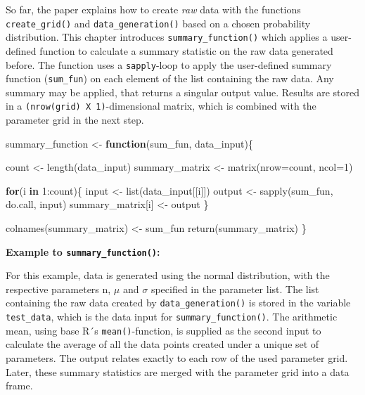 \documentclass[11pt,a4paper]{article}
\newenvironment{Shaded}{\begin{snugshade}}{\end{snugshade}}
\newcommand{\AttributeTok}[1]{\textcolor[rgb]{0.77,0.63,0.00}{#1}}
\newcommand{\ControlFlowTok}[1]{\textcolor[rgb]{0.13,0.29,0.53}{\textbf{#1}}}
\newcommand{\DecValTok}[1]{\textcolor[rgb]{0.00,0.00,0.81}{#1}}
\newcommand{\FunctionTok}[1]{\textcolor[rgb]{0.00,0.00,0.00}{#1}}
\newcommand{\NormalTok}[1]{#1}
\newcommand{\OtherTok}[1]{\textcolor[rgb]{0.56,0.35,0.01}{#1}}
\newcommand{\SpecialCharTok}[1]{\textcolor[rgb]{0.00,0.00,0.00}{#1}}
\begin{document}
So far, the paper explains how to create \emph{raw} data with the
functions \texttt{create\_grid()} and \texttt{data\_generation()} based
on a chosen probability distribution. This chapter introduces
\texttt{summary\_function()} which applies a user-defined function to
calculate a summary statistic on the raw data generated before. The
function uses a \texttt{sapply}-loop to apply the user-defined summary
function (\texttt{sum\_fun}) on each element of the list containing the
raw data. Any summary may be applied, that returns a singular output
value. Results are stored in a \texttt{(nrow(grid)\ X\ 1)}-dimensional
matrix, which is combined with the parameter grid in the next step.

\begin{Shaded}
\begin{Highlighting}[]
\NormalTok{summary\_function }\OtherTok{\textless{}{-}} \ControlFlowTok{function}\NormalTok{(sum\_fun, data\_input)\{}
  
\NormalTok{  count }\OtherTok{\textless{}{-}} \FunctionTok{length}\NormalTok{(data\_input)}
\NormalTok{  summary\_matrix }\OtherTok{\textless{}{-}} \FunctionTok{matrix}\NormalTok{(}\AttributeTok{nrow=}\NormalTok{count, }\AttributeTok{ncol=}\DecValTok{1}\NormalTok{)}
  
  \ControlFlowTok{for}\NormalTok{(i }\ControlFlowTok{in} \DecValTok{1}\SpecialCharTok{:}\NormalTok{count)\{}
\NormalTok{    input }\OtherTok{\textless{}{-}} \FunctionTok{list}\NormalTok{(data\_input[[i]])}
\NormalTok{    output }\OtherTok{\textless{}{-}} \FunctionTok{sapply}\NormalTok{(sum\_fun, do.call, input)}
\NormalTok{    summary\_matrix[i] }\OtherTok{\textless{}{-}}\NormalTok{ output}
\NormalTok{  \}}

  \FunctionTok{colnames}\NormalTok{(summary\_matrix) }\OtherTok{\textless{}{-}}\NormalTok{ sum\_fun}
  \FunctionTok{return}\NormalTok{(summary\_matrix)}
\NormalTok{\}}
\end{Highlighting}
\end{Shaded}

\textbf{Example to \texttt{summary\_function()}:}

For this example, data is generated using the normal distribution, with
the respective parameters n, \(\mu\) and \(\sigma\) specified in the
parameter list. The list containing the raw data created by
\texttt{data\_generation()} is stored in the variable
\texttt{test\_data}, which is the data input for
\texttt{summary\_function()}. The arithmetic mean, using base R´s
\texttt{mean()}-function, is supplied as the second input to calculate
the average of all the data points created under a unique set of
parameters. The output relates exactly to each row of the used parameter
grid. Later, these summary statistics are merged with the parameter grid
into a data frame.
\end{document}
